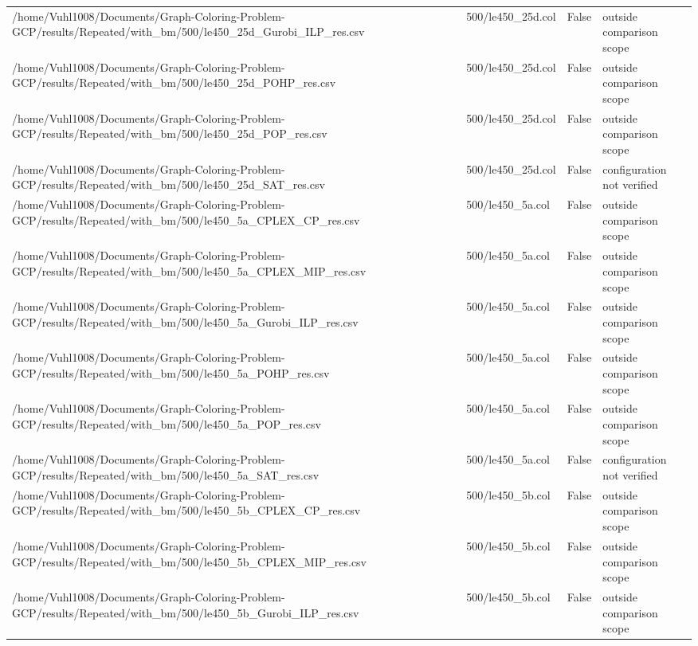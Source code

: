 \begin{table}[htbp]
\begin{tabular}{llll}
/home/Vuhl1008/Documents/Graph-Coloring-Problem-GCP/results/Repeated/with\_bm/500/le450\_25d\_Gurobi\_ILP\_res.csv & 500/le450\_25d.col & False & outside comparison scope \\
/home/Vuhl1008/Documents/Graph-Coloring-Problem-GCP/results/Repeated/with\_bm/500/le450\_25d\_POHP\_res.csv & 500/le450\_25d.col & False & outside comparison scope \\
/home/Vuhl1008/Documents/Graph-Coloring-Problem-GCP/results/Repeated/with\_bm/500/le450\_25d\_POP\_res.csv & 500/le450\_25d.col & False & outside comparison scope \\
/home/Vuhl1008/Documents/Graph-Coloring-Problem-GCP/results/Repeated/with\_bm/500/le450\_25d\_SAT\_res.csv & 500/le450\_25d.col & False & configuration not verified \\
/home/Vuhl1008/Documents/Graph-Coloring-Problem-GCP/results/Repeated/with\_bm/500/le450\_5a\_CPLEX\_CP\_res.csv & 500/le450\_5a.col & False & outside comparison scope \\
/home/Vuhl1008/Documents/Graph-Coloring-Problem-GCP/results/Repeated/with\_bm/500/le450\_5a\_CPLEX\_MIP\_res.csv & 500/le450\_5a.col & False & outside comparison scope \\
/home/Vuhl1008/Documents/Graph-Coloring-Problem-GCP/results/Repeated/with\_bm/500/le450\_5a\_Gurobi\_ILP\_res.csv & 500/le450\_5a.col & False & outside comparison scope \\
/home/Vuhl1008/Documents/Graph-Coloring-Problem-GCP/results/Repeated/with\_bm/500/le450\_5a\_POHP\_res.csv & 500/le450\_5a.col & False & outside comparison scope \\
/home/Vuhl1008/Documents/Graph-Coloring-Problem-GCP/results/Repeated/with\_bm/500/le450\_5a\_POP\_res.csv & 500/le450\_5a.col & False & outside comparison scope \\
/home/Vuhl1008/Documents/Graph-Coloring-Problem-GCP/results/Repeated/with\_bm/500/le450\_5a\_SAT\_res.csv & 500/le450\_5a.col & False & configuration not verified \\
/home/Vuhl1008/Documents/Graph-Coloring-Problem-GCP/results/Repeated/with\_bm/500/le450\_5b\_CPLEX\_CP\_res.csv & 500/le450\_5b.col & False & outside comparison scope \\
/home/Vuhl1008/Documents/Graph-Coloring-Problem-GCP/results/Repeated/with\_bm/500/le450\_5b\_CPLEX\_MIP\_res.csv & 500/le450\_5b.col & False & outside comparison scope \\
/home/Vuhl1008/Documents/Graph-Coloring-Problem-GCP/results/Repeated/with\_bm/500/le450\_5b\_Gurobi\_ILP\_res.csv & 500/le450\_5b.col & False & outside comparison scope \\

\end{tabular}
\end{table}
